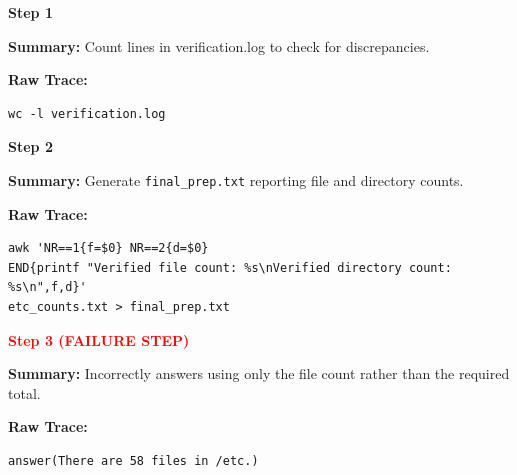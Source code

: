 \documentclass[11pt]{article}
\begin{document}
\begin{tcolorbox}[
breakable,
colback=customwhite,
colframe=customyellow,
title=Instruction,
fontupper=\fontfamily{pcr}\selectfont\scriptsize
]

\textbf{Step 1}

\textbf{Summary:}  
Count lines in verification.log to check for discrepancies.

\textbf{Raw Trace:}
\begin{verbatim}
wc -l verification.log
\end{verbatim}

\medskip
\textbf{Step 2}

\textbf{Summary:}  
Generate \verb|final_prep.txt| reporting file and directory counts.

\textbf{Raw Trace:}
\begin{verbatim}
awk 'NR==1{f=$0} NR==2{d=$0}
END{printf "Verified file count: %s\nVerified directory count: %s\n",f,d}'
etc_counts.txt > final_prep.txt
\end{verbatim}

\medskip
\textbf{\textcolor{red}{Step 3 (FAILURE STEP)}}

\textbf{Summary:}  
Incorrectly answers using only the file count rather than the required total.

\textbf{Raw Trace:}
\begin{verbatim}
answer(There are 58 files in /etc.)
\end{verbatim}

\end{tcolorbox}

\clearpage
\end{document}
